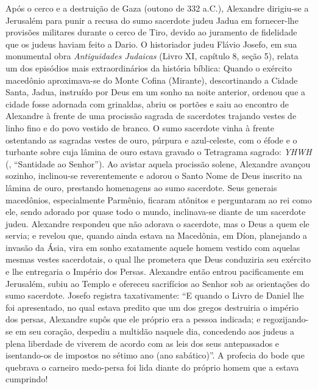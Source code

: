 Após o cerco e a destruição de Gaza (outono de 332 a.C.), Alexandre dirigiu-se a Jerusalém para punir a recusa do sumo sacerdote judeu Jadua em fornecer-lhe provisões militares durante o cerco de Tiro, devido ao juramento de fidelidade que os judeus haviam feito a Dario.
O historiador judeu Flávio Josefo, em sua monumental obra \textit{Antiguidades Judaicas} (Livro XI, capítulo 8, seção 5), relata um dos episódios mais extraordinários da história bíblica:
Quando o exército macedônio aproximava-se do Monte Cofina (Mirante), descortinando a Cidade Santa, Jadua, instruído por Deus em um sonho na noite anterior, ordenou que a cidade fosse adornada com grinaldas, abriu os portões e saiu ao encontro de Alexandre à frente de uma procissão sagrada de sacerdotes trajando vestes de linho fino e do povo vestido de branco. O sumo sacerdote vinha à frente ostentando as sagradas vestes de ouro, púrpura e azul-celeste, com o éfode e o turbante sobre cuja lâmina de ouro estava gravado o Tetragrama sagrado: \textit{YHWH} (, ``Santidade ao Senhor'').
Ao avistar aquela procissão solene, Alexandre avançou sozinho, inclinou-se reverentemente e adorou o Santo Nome de Deus inscrito na lâmina de ouro, prestando homenagens ao sumo sacerdote. Seus generais macedônios, especialmente Parmênio, ficaram atônitos e perguntaram ao rei como ele, sendo adorado por quase todo o mundo, inclinava-se diante de um sacerdote judeu. Alexandre respondeu que não adorava o sacerdote, mas o Deus a quem ele servia; e revelou que, quando ainda estava na Macedônia, em Díon, planejando a invasão da Ásia, vira em sonho exatamente aquele homem vestido com aquelas mesmas vestes sacerdotais, o qual lhe prometera que Deus conduziria seu exército e lhe entregaria o Império dos Persas.
Alexandre então entrou pacificamente em Jerusalém, subiu ao Templo e ofereceu sacrifícios ao Senhor sob as orientações do sumo sacerdote. Josefo registra taxativamente: ``E quando o Livro de Daniel lhe foi apresentado, no qual estava predito que um dos gregos destruiria o império dos persas, Alexandre supôs que ele próprio era a pessoa indicada; e regozijando-se em seu coração, despediu a multidão naquele dia, concedendo aos judeus a plena liberdade de viverem de acordo com as leis dos seus antepassados e isentando-os de impostos no sétimo ano (ano sabático)''. A profecia do bode que quebrava o carneiro medo-persa foi lida diante do próprio homem que a estava cumprindo!


